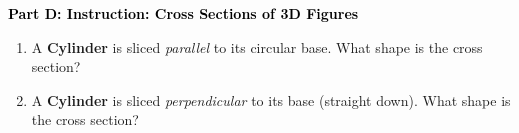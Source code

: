 \documentclass[12pt, letterpaper, fleqn]{article}
\begin{document}
\newpage

\begin{tcolorbox}[colback=customteal!20]
\large\textcolor{black}{\textbf{Part D: Instruction: Cross Sections of 3D Figures}}
\end{tcolorbox}

\vspace{3mm}

\begin{enumerate}[itemsep=2.2cm, leftmargin=0.6cm, resume]
\item A \textbf{Cylinder} is sliced \textit{parallel} to its circular base. What shape is the cross section?
\item A \textbf{Cylinder} is sliced \textit{perpendicular} to its base (straight down). What shape is the cross section?
\end{enumerate}
\end{document}
